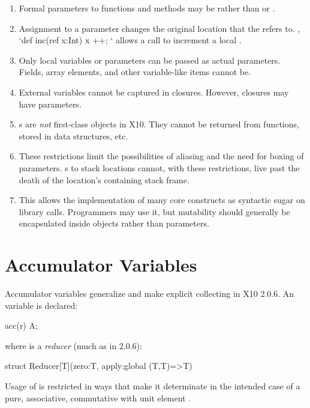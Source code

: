 \begin{enumerate}

\item Formal parameters to functions and methods may be  rather than
       or .  
\item Assignment to a  parameter  changes the original
      location that the  refers to.  \eg, 
      \xcd`def inc(ref x:Int) { x ++; }`
      allows a call  to increment a local  .
\item Only local variables or  parameters can be passed as actual
       parameters.  Fields, array elements, and other variable-like
      items cannot be. 
\item External  variables cannot be captured in closures. However,
      closures may have  parameters.
\item {}s are {\em not} first-class objects in X10. They cannot be
      returned from functions, stored in data structures, etc.
\item These restrictions limit the possibilities of aliasing and the need for
      boxing of  parameters.  s to stack locations cannot,
      with these restrictions, live past the death of the location's
      containing stack frame.      
\item This allows the implementation of many core constructs as syntactic
      sugar on library calls.   Programmers may use it, but mutability should
      generally be encapsulated inside objects rather than 
      parameters. 
\end{enumerate}


\section{Accumulator Variables}

Accumulator variables generalize and make explicit collecting  in
X10 2.0.6.  An  variable is declared: 
\begin{xten}
acc(r) A;
\end{xten}
where  is a {\em reducer} (much as in 2.0.6): 
\begin{xten}
struct Reducer[T](zero:T, apply:global (T,T)=>T){}
\end{xten}

Usage of  is restricted in ways that make it determinate in the
intended case of a pure, associative, commutative  with unit
element .  

